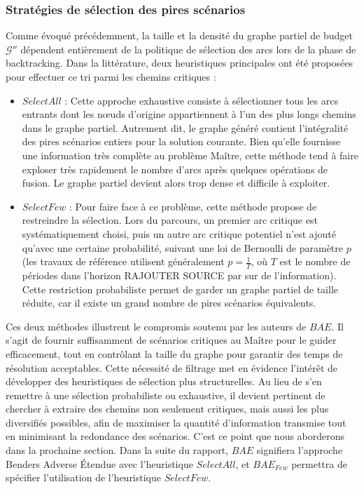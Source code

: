 \documentclass[12pt, a4paper, twoside]{article}
\numberwithin{equation}{section}
\begin{document}
	\subsubsection{Stratégies de sélection des pires scénarios}
	
	Comme évoqué précédemment, la taille et la densité du graphe partiel de budget $\mathcal{G}''$ dépendent entièrement de la politique de sélection des arcs lors de la phase de backtracking. Dans la littérature, deux heuristiques principales ont été proposées pour effectuer ce tri parmi les chemins critiques :
	
	\begin{itemize}
		\item $SelectAll$ : Cette approche exhaustive consiste à sélectionner tous les arcs entrants dont les nœuds d'origine appartiennent à l'un des plus longs chemins dans le graphe partiel. Autrement dit, le graphe généré contient l'intégralité des pires scénarios entiers pour la solution courante. Bien qu'elle fournisse une information très complète au problème Maître, cette méthode tend à faire exploser très rapidement le nombre d'arcs après quelques opérations de fusion. Le graphe partiel devient alors trop dense et difficile à exploiter.
		\item $SelectFew$ : Pour faire face à ce problème, cette méthode propose de restreindre la sélection. Lors du parcours, un premier arc critique est systématiquement choisi, puis un autre arc critique potentiel n'est ajouté qu'avec une certaine probabilité, suivant une loi de Bernoulli de paramètre $p$ (les travaux de référence utilisent généralement $p=\frac{1}{T}$, où $T$ est le nombre de périodes dans l'horizon RAJOUTER SOURCE par sur de l'information). Cette restriction probabiliste permet de garder un graphe partiel de taille réduite, car il existe un grand nombre de pires scénarios équivalents.
	\end{itemize}
	
	Ces deux méthodes illustrent le compromis soutenu par les auteurs de $BAE$. Il s'agit de fournir suffisamment de scénarios critiques au Maître pour le guider efficacement, tout en contrôlant la taille du graphe pour garantir des temps de résolution acceptables. Cette nécessité de filtrage met en évidence l'intérêt de développer des heuristiques de sélection plus structurelles. Au lieu de s'en remettre à une sélection probabiliste ou exhaustive, il devient pertinent de chercher à extraire des chemins non seulement critiques, mais aussi les plus diversifiés possibles, afin de maximiser la quantité d'information transmise tout en minimisant la redondance des scénarios. C'est ce point que nous aborderons dans la prochaine section. Dans la suite du rapport, $BAE$ signifiera l'approche  Benders Adverse Étendue avec l'heuristique $SelectAll$, et $BAE_{Few}$ permettra de spécifier l'utilisation de l'heuristique $SelectFew$.
	
\end{document}
